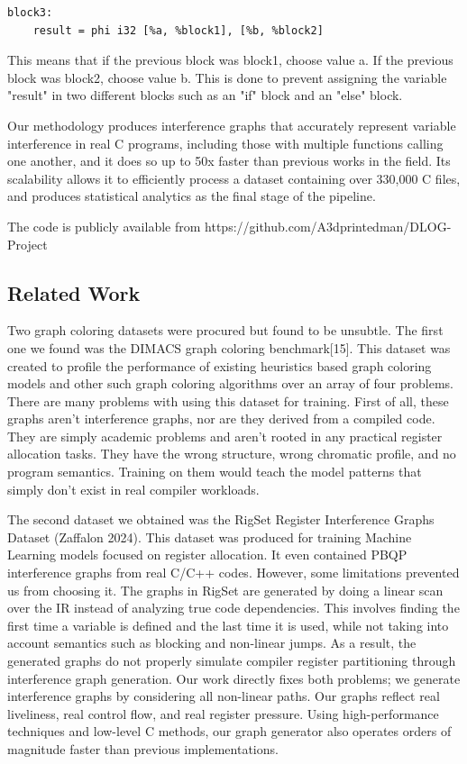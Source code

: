 \documentclass{article}
\begin{document}
\begin{verbatim}
block3:
    result = phi i32 [%a, %block1], [%b, %block2]    
\end{verbatim}

This means that if the previous block was block1, choose value a. If the previous block was block2, choose value b. This is done to prevent assigning the variable "result" in two different blocks such as an "if" block and an "else" block.

Our methodology produces interference graphs that accurately represent variable interference in real C programs, including those with multiple functions calling one another, and it does so up to 50x faster than previous works in the field. Its scalability allows it to efficiently process a dataset containing over 330,000 C files, and produces statistical analytics as the final stage of the pipeline.

The code is publicly available from https://github.com/A3dprintedman/DLOG-Project

\subsection{Related Work}

Two graph coloring datasets were procured but found to be unsubtle. The first one we found was the DIMACS graph coloring benchmark[15]. This dataset was created to profile the performance of existing heuristics based graph coloring models and other such graph coloring algorithms over an array of four problems. There are many problems with using this dataset for training. First of all, these graphs aren't interference graphs, nor are they derived from a compiled code. They are simply academic problems and aren't rooted in any practical register allocation tasks. They have the wrong structure, wrong chromatic profile, and no program semantics. Training on them would teach the model patterns that simply don’t exist in real compiler workloads. 

The second dataset we obtained was the RigSet Register Interference Graphs Dataset (Zaffalon 2024). This dataset was produced for training Machine Learning models focused on register allocation. It even contained PBQP interference graphs from real C/C++ codes. However, some limitations prevented us from choosing it. The graphs in RigSet are generated by doing a linear scan over the IR instead of analyzing true code dependencies. This involves finding the first time a variable is defined and the last time it is used, while not taking into account semantics such as blocking and non-linear jumps. As a result, the generated graphs do not properly simulate compiler register partitioning through interference graph generation. Our work directly fixes both problems; we generate interference graphs by considering all non-linear paths. Our graphs reflect real liveliness, real control flow, and real register pressure. Using high-performance techniques and low-level C methods, our graph generator also operates orders of magnitude faster than previous implementations. 
\end{document}
